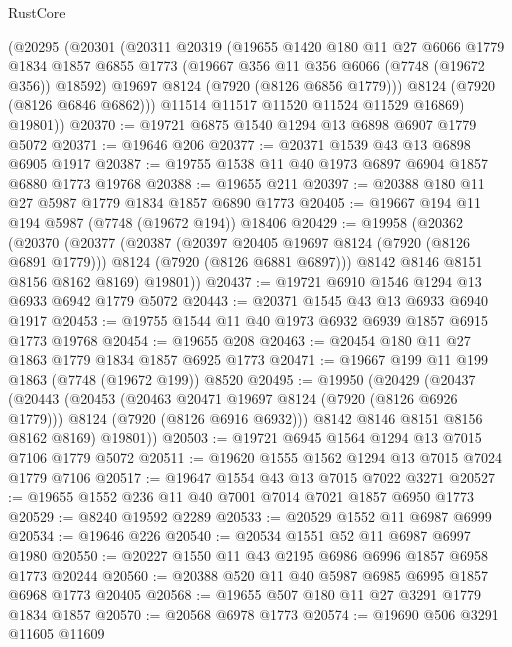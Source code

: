 \begin{lexlean}{RustCore}
\begin{coremodule}
      (@20295
        (@20301
          (@20311
            @20319
            (@19655
              @1420
              @180
              @11
              @27
              @6066
              @1779
              @1834
              @1857
              @6855
              @1773
              (@19667 @356 @11 @356 @6066 (@7748 (@19672 @356)) @18592)
              @19697
              @8124
              (@7920 (@8126 @6856 @1779)))
            @8124
            (@7920 (@8126 @6846 @6862)))
          @11514
          @11517
          @11520
          @11524
          @11529
          @16869)
        @19801))
@20370 := @19721 @6875 @1540 @1294 @13 @6898 @6907 @1779 @5072
@20371 := @19646 @206
@20377 := @20371 @1539 @43 @13 @6898 @6905 @1917
@20387 := @19755 @1538 @11 @40 @1973 @6897 @6904 @1857 @6880 @1773 @19768
@20388 := @19655 @211
@20397 := @20388 @180 @11 @27 @5987 @1779 @1834 @1857 @6890 @1773
@20405 := @19667 @194 @11 @194 @5987 (@7748 (@19672 @194)) @18406
@20429 := @19958
    (@20362
      (@20370
        (@20377
          (@20387
            (@20397 @20405 @19697 @8124 (@7920 (@8126 @6891 @1779)))
            @8124
            (@7920 (@8126 @6881 @6897)))
          @8142
          @8146
          @8151
          @8156
          @8162
          @8169)
        @19801))
@20437 := @19721 @6910 @1546 @1294 @13 @6933 @6942 @1779 @5072
@20443 := @20371 @1545 @43 @13 @6933 @6940 @1917
@20453 := @19755 @1544 @11 @40 @1973 @6932 @6939 @1857 @6915 @1773 @19768
@20454 := @19655 @208
@20463 := @20454 @180 @11 @27 @1863 @1779 @1834 @1857 @6925 @1773
@20471 := @19667 @199 @11 @199 @1863 (@7748 (@19672 @199)) @8520
@20495 := @19950
    (@20429
      (@20437
        (@20443
          (@20453
            (@20463 @20471 @19697 @8124 (@7920 (@8126 @6926 @1779)))
            @8124
            (@7920 (@8126 @6916 @6932)))
          @8142
          @8146
          @8151
          @8156
          @8162
          @8169)
        @19801))
@20503 := @19721 @6945 @1564 @1294 @13 @7015 @7106 @1779 @5072
@20511 := @19620 @1555 @1562 @1294 @13 @7015 @7024 @1779 @7106
@20517 := @19647 @1554 @43 @13 @7015 @7022 @3271
@20527 := @19655 @1552 @236 @11 @40 @7001 @7014 @7021 @1857 @6950 @1773
@20529 := @8240 @19592 @2289
@20533 := @20529 @1552 @11 @6987 @6999
@20534 := @19646 @226
@20540 := @20534 @1551 @52 @11 @6987 @6997 @1980
@20550 := @20227 @1550 @11 @43 @2195 @6986 @6996 @1857 @6958 @1773 @20244
@20560 := @20388 @520 @11 @40 @5987 @6985 @6995 @1857 @6968 @1773 @20405
@20568 := @19655 @507 @180 @11 @27 @3291 @1779 @1834 @1857
@20570 := @20568 @6978 @1773
@20574 := @19690 @506 @3291 @11605 @11609

\end{coremodule}
\end{lexlean}
